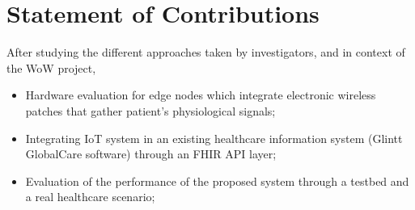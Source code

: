 

\section{Statement of Contributions}


After studying the different approaches taken by investigators, and in context of the \acs{WoW} project, 


\begin{itemize}
    \item Hardware evaluation for edge nodes which integrate electronic wireless patches that gather patient's physiological signals;
    \item Integrating IoT system in an existing healthcare information system (Glintt GlobalCare software) through an FHIR API layer;
    \item Evaluation of the performance of the proposed system through a testbed and a real healthcare scenario;
\end{itemize}
